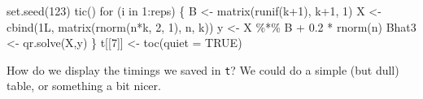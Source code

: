 \documentclass[
  letterpaper,
]{book}
\newenvironment{Shaded}{\begin{snugshade}}{\end{snugshade}}
\newcommand{\AttributeTok}[1]{\textcolor[rgb]{0.40,0.45,0.13}{#1}}
\newcommand{\ConstantTok}[1]{\textcolor[rgb]{0.56,0.35,0.01}{#1}}
\newcommand{\ControlFlowTok}[1]{\textcolor[rgb]{0.00,0.23,0.31}{#1}}
\newcommand{\DecValTok}[1]{\textcolor[rgb]{0.68,0.00,0.00}{#1}}
\newcommand{\FloatTok}[1]{\textcolor[rgb]{0.68,0.00,0.00}{#1}}
\newcommand{\FunctionTok}[1]{\textcolor[rgb]{0.28,0.35,0.67}{#1}}
\newcommand{\NormalTok}[1]{\textcolor[rgb]{0.00,0.23,0.31}{#1}}
\newcommand{\OtherTok}[1]{\textcolor[rgb]{0.00,0.23,0.31}{#1}}
\newcommand{\SpecialCharTok}[1]{\textcolor[rgb]{0.37,0.37,0.37}{#1}}
\begin{document}
\begin{Shaded}
\begin{Highlighting}[]
\FunctionTok{set.seed}\NormalTok{(}\DecValTok{123}\NormalTok{)}
\FunctionTok{tic}\NormalTok{()}
\ControlFlowTok{for}\NormalTok{ (i }\ControlFlowTok{in} \DecValTok{1}\SpecialCharTok{:}\NormalTok{reps) \{ }
\NormalTok{  B }\OtherTok{\textless{}{-}} \FunctionTok{matrix}\NormalTok{(}\FunctionTok{runif}\NormalTok{(k}\SpecialCharTok{+}\DecValTok{1}\NormalTok{), k}\SpecialCharTok{+}\DecValTok{1}\NormalTok{, }\DecValTok{1}\NormalTok{)}
\NormalTok{  X }\OtherTok{\textless{}{-}} \FunctionTok{cbind}\NormalTok{(1L, }\FunctionTok{matrix}\NormalTok{(}\FunctionTok{rnorm}\NormalTok{(n}\SpecialCharTok{*}\NormalTok{k, }\DecValTok{2}\NormalTok{, }\DecValTok{1}\NormalTok{), n, k))}
\NormalTok{  y }\OtherTok{\textless{}{-}}\NormalTok{ X }\SpecialCharTok{\%*\%}\NormalTok{ B }\SpecialCharTok{+} \FloatTok{0.2} \SpecialCharTok{*} \FunctionTok{rnorm}\NormalTok{(n) }
\NormalTok{  Bhat3 }\OtherTok{\textless{}{-}} \FunctionTok{qr.solve}\NormalTok{(X,y) }
\NormalTok{  \}}
\NormalTok{t[[}\DecValTok{7}\NormalTok{]] }\OtherTok{\textless{}{-}} \FunctionTok{toc}\NormalTok{(}\AttributeTok{quiet =} \ConstantTok{TRUE}\NormalTok{)}
\end{Highlighting}
\end{Shaded}

How do we display the timings we saved in \texttt{t}? We could do a
simple (but dull) table, or something a bit nicer.
\end{document}

